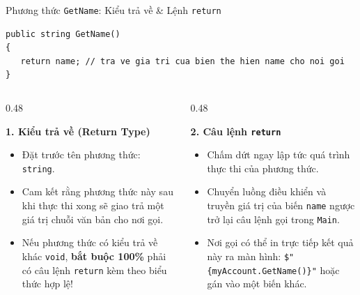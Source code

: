 \documentclass[aspectratio=169, 10pt]{beamer}
\begin{document}
\begin{frame}[fragile]{Phương thức \texttt{GetName}: Kiểu trả về \& Lệnh \texttt{return}}
  \begin{tcolorbox}[colback=CodeBg,colframe=UniNavy,title=\textbf{Giải phẫu Khai báo Phương thức GetName},fonttitle=\small\bfseries]
\begin{lstlisting}
public string GetName()
{
   return name; // tra ve gia tri cua bien the hien name cho noi goi
}
\end{lstlisting}
  \end{tcolorbox}
  \begin{columns}[T]
    \begin{column}{0.48\textwidth}
      \begin{block}{\textbf{1. Kiểu trả về (Return Type)}}
        \begin{itemize}\small
          \item Đặt trước tên phương thức: \texttt{string}.
          \item Cam kết rằng phương thức này sau khi thực thi xong sẽ giao trả một giá trị chuỗi văn bản cho nơi gọi.
          \item Nếu phương thức có kiểu trả về khác \texttt{void}, \textbf{bắt buộc 100\%} phải có câu lệnh \texttt{return} kèm theo biểu thức hợp lệ!
        \end{itemize}
      \end{block}
    \end{column}

    \begin{column}{0.48\textwidth}
      \begin{exampleblock}{\textbf{2. Câu lệnh \texttt{return}}}
        \begin{itemize}\small
          \item Chấm dứt ngay lập tức quá trình thực thi của phương thức.
          \item Chuyển luồng điều khiển và truyền giá trị của biến \texttt{name} ngược trở lại câu lệnh gọi trong \texttt{Main}.
          \item Nơi gọi có thể in trực tiếp kết quả này ra màn hình: \texttt{\$"\{myAccount.GetName()\}"} hoặc gán vào một biến khác.
        \end{itemize}
      \end{exampleblock}
    \end{column}
  \end{columns}
\end{frame}
\end{document}
